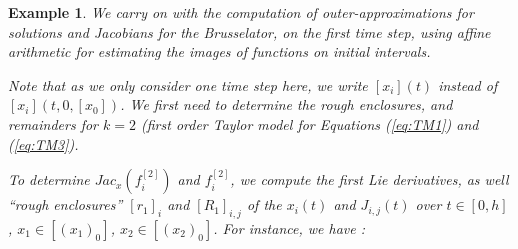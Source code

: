 \documentclass{sig-alternate-05-2015} %
\newcommand\ForAuthors[1]%
 {\par\smallskip                     %
  \begin{center}%
   \fbox%
   {\parbox{0.9\linewidth}%
    {\raggedright\sc--- #1}%
   }%
  \end{center}%
  \par\smallskip                     %
 }
\newtheorem{example}{Example}
\def\int#1{\mbox{$[ #1 ]$}}
\begin{document}
\begin{example}
\label{running2}
We carry on with the computation of outer-approximations for solutions and Jacobians for 
the Brusselator, on the first time
step, using affine arithmetic for estimating the images of functions on initial intervals.


Note that
as we only consider one time step here, we write $\int{x_i}(t)$ instead of $\int{x_i}(t,0,\int{x_0})$. We first need to determine the rough enclosures, and remainders
for $k=2$ (first order Taylor model for Equations (\ref{eq:TM1}) and (\ref{eq:TM3}).




To determine $Jac_x(f_i^{[2]})$ and $f_i^{[2]}$, we compute the first Lie derivatives, as well ``rough enclosures''
$\int{r_1}_i$ and $\int{R_1}_{i,j}$ of the $x_i(t)$ and $J_{i,j}(t)$ over $t\in [0,h]$, 
$x_1 \in \int{(x_1)_0}$, $x_2 \in \int{(x_2)_0}$. For instance, we have : 


\end{example}
\end{document}
